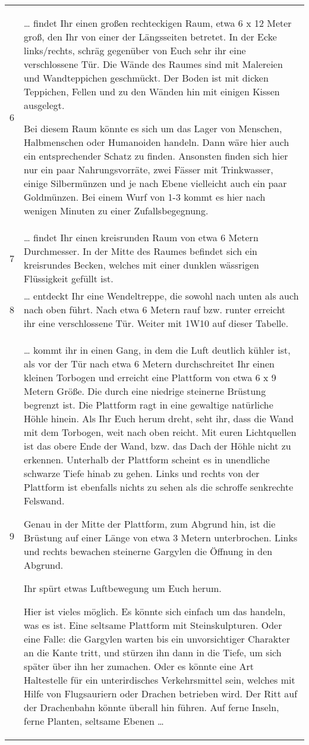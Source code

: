 \begin{tabularx}{\columnwidth}{cZ}
6 & 
  \ldots{} findet Ihr einen großen rechteckigen Raum, etwa 6 x 12 Meter
  groß, den Ihr von einer der Längsseiten betretet. In der Ecke
  links/rechts, schräg gegenüber von Euch sehr ihr eine verschlossene
  Tür. Die Wände des Raumes sind mit Malereien und Wandteppichen
  geschmückt. Der Boden ist mit dicken Teppichen, Fellen und zu den
  Wänden hin mit einigen Kissen ausgelegt.

  Bei diesem Raum könnte es sich um das Lager von Menschen, Halbmenschen
  oder Humanoiden handeln. Dann wäre hier auch ein entsprechender Schatz
  zu finden. Ansonsten finden sich hier nur ein paar Nahrungsvorräte,
  zwei Fässer mit Trinkwasser, einige Silbermünzen und je nach Ebene
  vielleicht auch ein paar Goldmünzen. Bei einem Wurf von 1-3 kommt es
  hier nach wenigen Minuten zu einer Zufallsbegegnung.
\\
7 & 
  \ldots{} findet Ihr einen kreisrunden Raum von etwa 6 Metern
  Durchmesser. In der Mitte des Raumes befindet sich ein kreisrundes
  Becken, welches mit einer dunklen wässrigen Flüssigkeit gefüllt ist.
\\
8 & 
  \ldots{} entdeckt Ihr eine Wendeltreppe, die sowohl nach unten als
  auch nach oben führt. Nach etwa 6 Metern rauf bzw. runter erreicht ihr
  eine verschlossene Tür. Weiter mit 1W10 auf dieser Tabelle.
\\
9 & 
  \ldots{} kommt ihr in einen Gang, in dem die Luft deutlich kühler ist,
  als vor der Tür nach etwa 6 Metern durchschreitet Ihr einen kleinen
  Torbogen und erreicht eine Plattform von etwa 6 x 9 Metern Größe. Die
  durch eine niedrige steinerne Brüstung begrenzt ist. Die Plattform
  ragt in eine gewaltige natürliche Höhle hinein. Als Ihr Euch herum
  dreht, seht ihr, dass die Wand mit dem Torbogen, weit nach oben
  reicht. Mit euren Lichtquellen ist das obere Ende der Wand, bzw. das
  Dach der Höhle nicht zu erkennen. Unterhalb der Plattform scheint es
  in unendliche schwarze Tiefe hinab zu gehen. Links und rechts von der
  Plattform ist ebenfalls nichts zu sehen als die schroffe senkrechte
  Felswand.

  Genau in der Mitte der Plattform, zum Abgrund hin, ist die Brüstung
  auf einer Länge von etwa 3 Metern unterbrochen. Links und rechts
  bewachen steinerne Gargylen die Öffnung in den Abgrund.

  Ihr spürt etwas Luftbewegung um Euch herum.

  Hier ist vieles möglich. Es könnte sich einfach um das handeln, was es
  ist. Eine seltsame Plattform mit Steinskulpturen. Oder eine Falle: die
  Gargylen warten bis ein unvorsichtiger Charakter an die Kante tritt,
  und stürzen ihn dann in die Tiefe, um sich später über ihn her
  zumachen. Oder es könnte eine Art Haltestelle für ein unterirdisches
  Verkehrsmittel sein, welches mit Hilfe von Flugsauriern oder Drachen
  betrieben wird. Der Ritt auf der Drachenbahn könnte überall hin
  führen. Auf ferne Inseln, ferne Planten, seltsame Ebenen \ldots{}
\\
\end{tabularx}
